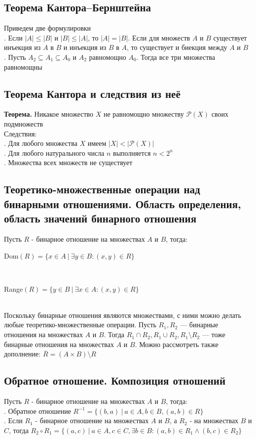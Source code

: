 \documentclass[a4paper]{article}
\begin{document}
\subsection{Теорема Кантора–Бернштейна}
Приведем две формулировки\\[2mm]
. Если $|A|\leqslant|B|$ и $|B|\leqslant|A|$, то $|A|=|B|$. Если для множеств $A$ и $B$ существует инъекция из $A$ в $B$ и инъекция из $B$ в $A$, то существует и биекция между $A$ и $B$\\[2mm]
. Пусть $A_2\subseteq A_1\subseteq A_0$ и $A_2$ равномощно $A_0$. Тогда все три множества равномощны
\subsection{Теорема Кантора и следствия из неё}
\textbf{Теорема.} Никакое множество $X$ не равномощно множеству $\mathcal{P}(X)$ своих подмножеств\\[2mm]
Следствия:\\[2mm]
. Для любого множества $X$ имеем $|X|<|\mathcal{P}(X)|$\\[2mm]
. Для любого натурального числа $n$ выполняется $n<2^n$\\[2mm]
. Множества всех множеств не существует
\subsection{Теоретико-множественные операции над бинарными отношениями. Область определения, область значений бинарного отношения}
Пусть $R$ - бинарное отношение на множествах $A$ и $B$, тогда:\\[2mm]
\centerline{Dom$(R)=\{x\in A\ |\ \exists y\in B: (x,y)\in R\}$}\\[2mm]
\centerline{Range$(R)=\{y\in B\ |\ \exists x\in A: (x,y)\in R\}$}\\[2mm]
\indent Поскольку бинарные отношения являются множествами, с ними можно делать любые теоретико-множественные операции. Пусть $R_1, R_2$ — бинарные отношения на множествах $A$ и $B$. Тогда $R_1\cap R_2, R_1\cup R_2, R_1\setminus R_2$ — тоже бинарные отношения на множествах $A$ и $B$. Можно рассмотреть также дополнение: $\overline{R}=(A\times B)\setminus R$
\subsection{Обратное отношение. Композиция отношений}
\label{sec:binary}
Пусть $R$ - бинарное отношение на множествах $A$ и $B$, тогда:\\[2mm]
. Обратное отношение $R^{-1}=\{(b,a)\ |\ a\in A, b\in B, (a,b)\in R\}$\\[2mm]
. Если $R_1$ - бинарное отношение на множествах $A$ и $B$, а $R_2$ - на множествах $B$ и $C$, тогда $R_2\circ R_1=\{(a,c)\ |\ a\in A, c\in C, \exists b\in B: (a,b)\in R_1\wedge(b,c)\in R_2\}$\\[2mm]
\end{document}
